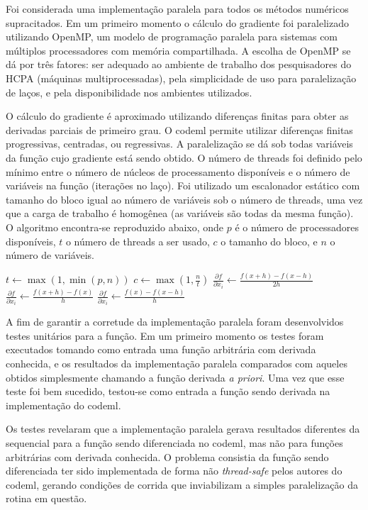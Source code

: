 \documentclass[cic,tc]{iiufrgs}
\begin{document}
Foi considerada uma implementação paralela para todos os métodos numéricos
supracitados. Em um primeiro momento o cálculo do gradiente foi paralelizado
utilizando OpenMP, um modelo de programação paralela para sistemas com
múltiplos processadores com memória compartilhada.\cite{chandra2001parallel} A
escolha de OpenMP se dá por três fatores: ser adequado ao ambiente de trabalho
dos pesquisadores do HCPA (máquinas multiprocessadas), pela simplicidade de uso
para paralelização de laços, e pela disponibilidade nos ambientes utilizados.

O cálculo do gradiente é aproximado utilizando diferenças finitas para obter as
derivadas parciais de primeiro grau. O codeml permite utilizar diferenças
finitas progressivas, centradas, ou regressivas. A paralelização se dá sob
todas variáveis da função cujo gradiente está sendo obtido. O número de threads
foi definido pelo mínimo entre o número de núcleos de processamento disponíveis
e o número de variáveis na função (iterações no laço). Foi utilizado um
escalonador estático com tamanho do bloco igual ao número de variáveis sob o
número de threads, uma vez que a carga de trabalho é homogênea (as variáveis
são todas da mesma função). O algoritmo encontra-se reproduzido abaixo, onde
$p$ é o número de processadores disponíveis, $t$ o número de threads a ser
usado, $c$ o tamanho do bloco, e $n$ o número de variáveis.

\begin{algorithmic}
\State $t \gets \max(1, \min(p, n))$
\State $c \gets \max(1, \frac{n}{t})$
    \State $\frac{\partial f}{\partial x_i} \gets \frac{f(x+h)-f(x-h)}{2h}$
    \State $\frac{\partial f}{\partial x_i} \gets \frac{f(x+h)-f(x)}{h}$
  \Else
    \State $\frac{\partial f}{\partial x_i} \gets \frac{f(x)-f(x-h)}{h}$
  \EndIf
\EndFor
\end{algorithmic}

A fim de garantir a corretude da implementação paralela foram desenvolvidos
testes unitários para a função. Em um primeiro momento os testes foram
executados tomando como entrada uma função arbitrária com derivada conhecida,
e os resultados da implementação paralela comparados com aqueles obtidos
simplesmente chamando a função derivada \textit{a priori}. Uma vez que esse
teste foi bem sucedido, testou-se como entrada a função sendo derivada na
implementação do codeml.

Os testes revelaram que a implementação paralela gerava resultados diferentes
da sequencial para a função sendo diferenciada no codeml, mas não para funções
arbitrárias com derivada conhecida. O problema consistia da função sendo
diferenciada ter sido implementada de forma não \textit{thread-safe} pelos
autores do codeml, gerando condições de corrida que inviabilizam a simples
paralelização da rotina em questão.
\end{document}
